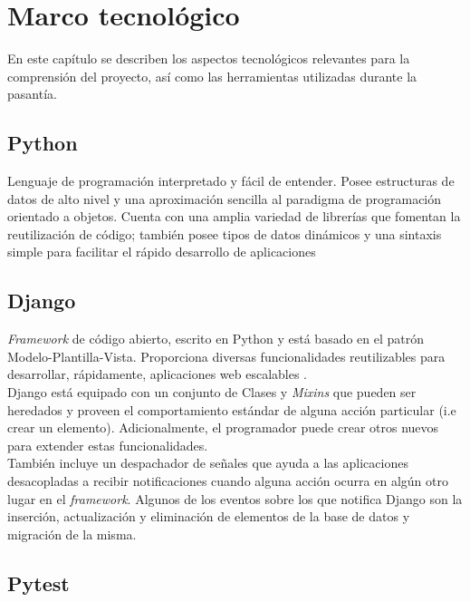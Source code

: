 \chapter{\textbf{Marco tecnológico}}

\thispagestyle{empty}

En este capítulo se describen los aspectos tecnológicos relevantes para la
comprensión del proyecto, así como las herramientas utilizadas durante la
pasantía.


\section{Python}

Lenguaje de programación interpretado y fácil de entender. Posee
estructuras de datos de alto nivel y una aproximación sencilla al paradigma de
programación orientado a objetos. Cuenta con una amplia variedad de librerías
que fomentan la reutilización de código; también posee tipos de datos dinámicos
y una sintaxis simple para facilitar el rápido desarrollo de aplicaciones
 \cite{Python_tutorial}

\section{Django}

\textit{Framework} de código abierto, escrito en Python y está basado en
el patrón Modelo-Plantilla-Vista. Proporciona diversas funcionalidades
reutilizables para desarrollar, rápidamente, aplicaciones web escalables
\cite{MVT}.\\

Django está equipado con un conjunto de Clases y \textit{Mixins} que pueden ser
heredados y proveen el comportamiento estándar de alguna acción particular (i.e
crear un elemento). Adicionalmente, el programador puede crear otros nuevos
para extender estas funcionalidades. \\

También incluye un despachador de señales que ayuda a las aplicaciones
desacopladas a recibir notificaciones cuando alguna acción ocurra en algún otro
lugar en el \textit{framework}. Algunos de los  eventos sobre los que notifica
Django son la inserción, actualización y eliminación de elementos de la base de
datos y migración de la misma.

\section{Pytest}

